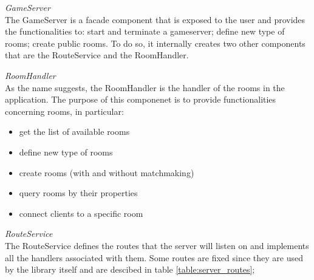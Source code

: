\bigskip
\textit{GameServer}
\\
The GameServer is a facade component that is exposed to the user and provides the functionalities to: start and terminate a gameserver; define new type of rooms; create public rooms. To do so, it internally creates two other components that are the RouteService and the RoomHandler.

\bigskip
\textit{RoomHandler}
\\
As the name suggests, the RoomHandler is the handler of the rooms in the application. The purpose of this componenet is to provide functionalities concerning rooms, in particular:
\begin{itemize}
	\item get the list of available rooms
	\item define new type of rooms
	\item create rooms (with and without matchmaking)
	\item query rooms by their properties
	\item connect clients to a specific room
\end{itemize}

\bigskip
\textit{RouteService}
\\
The RouteService defines the routes that the server will listen on and implements all the handlers associated with them. Some routes are fixed since they are used by the library itself and are descibed in table \ref{table:server_routes}; 


